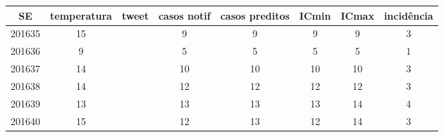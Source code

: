 \begin{tabular}{c|ccccccc}
  \hline
SE & temperatura & tweet & casos notif & casos preditos & ICmin & ICmax & incidência \\ 
  \hline
201635 & 15 &  & 9 & 9 & 9 & 9 & 3 \\ 
  201636 & 9 &  & 5 & 5 & 5 & 5 & 1 \\ 
  201637 & 14 &  & 10 & 10 & 10 & 10 & 3 \\ 
  201638 & 14 &  & 12 & 12 & 12 & 12 & 3 \\ 
  201639 & 13 &  & 13 & 13 & 13 & 14 & 4 \\ 
  201640 & 15 &  & 12 & 13 & 12 & 14 & 3 \\ 
   \hline
\end{tabular}
